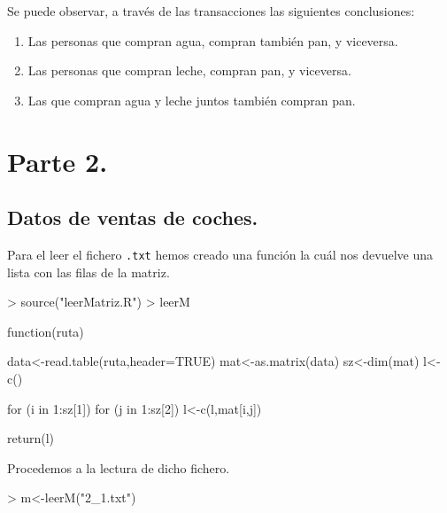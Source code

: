 \documentclass [a4paper] {article}
\begin{document}
{\bigskip
Se puede observar, a través de las transacciones las siguientes conclusiones:
\begin{enumerate}
\item Las personas que compran agua, compran también pan, y viceversa.
\item Las personas que compran leche, compran pan, y viceversa.
\item Las que compran agua y leche juntos también compran pan.
\end{enumerate}


\bigskip
\section{Parte 2.}
\subsection{Datos de ventas de coches.}
Para el leer el fichero \texttt{.txt} hemos creado una función la cuál nos devuelve una lista con las filas
de la matriz.
\begin{Schunk}
\begin{Sinput}
> source("leerMatriz.R")
> leerM
\end{Sinput}
\begin{Soutput}
function(ruta) {

    data<-read.table(ruta,header=TRUE)
    mat<-as.matrix(data)
    sz<-dim(mat)
    l<-c()

    for (i in 1:sz[1]) {
        for (j in 1:sz[2]){
            l<-c(l,mat[i,j])
        }
    }

    return(l)
}
\end{Soutput}
\end{Schunk}

Procedemos a la lectura de dicho fichero.
\begin{Schunk}
\begin{Sinput}
> m<-leerM("2_1.txt")
\end{Sinput}
\end{Schunk}

}
\end{document}

